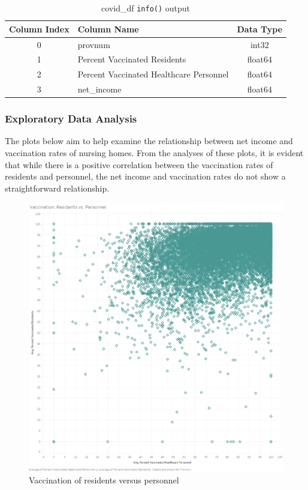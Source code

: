 \documentclass{article}
\theoremstyle{mytheoremstyle}
\theoremstyle{mytheoremstyle}
\theoremstyle{myproblemstyle}
\begin{document}
\begin{table}[h]
\centering
\caption{covid\_df \texttt{info()} output}
\label{tab:new_dataframe_structure}
\begin{tabular}{|c|l|c|}
\hline
\textbf{Column Index} & \textbf{Column Name}                               & \textbf{Data Type} \\ \hline
0                     & provnum                                            & int32              \\ \hline
1                     & Percent Vaccinated Residents                       & float64            \\ \hline
2                     & Percent Vaccinated Healthcare Personnel            & float64            \\ \hline
3                     & net\_income                                        & float64            \\ \hline
\end{tabular}
\end{table}


\subsubsection{Exploratory Data Analysis}
The plots below aim to help examine the relationship between net income and vaccination rates of nursing homes. From the analyses of these plots, it is evident that while there is a positive correlation between the vaccination rates of residents and personnel, the net income and vaccination rates do not show a straightforward relationship.
\begin{figure}[htbp]
\centering
\includegraphics[width=0.6\linewidth]{Images/Vaccination Residents vs. Personnel.png}
\caption{Vaccination of residents versus personnel}
\label{fig:vaccination scatterplot}
\end{figure}
\end{document}
